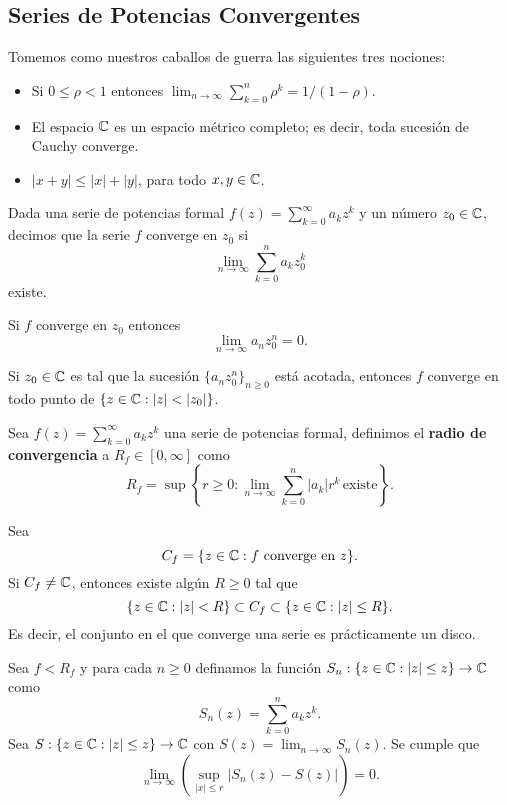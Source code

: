 \subsection{Series de Potencias Convergentes}

Tomemos como nuestros caballos de guerra las siguientes tres nociones:
\begin{itemize}
  \item Si $0 \leq \rho < 1$ entonces $\lim_{n \to \infty} \sum_{k = 0}^n \rho^k = 1 / (1 - \rho)$.
  \item El espacio $\mathbb C$ es un espacio m\'etrico completo; es decir, toda sucesi\'on de Cauchy converge.
  \item $|x + y| \leq |x| + |y|$, para todo $x, y \in \mathbb C$.
\end{itemize}

Dada una serie de potencias formal $f(z) = \sum_{k = 0}^{\infty} a_k z^k$ y un n\'umero $z_0 \in \mathbb C$,
decimos que la serie $f$ converge en $z_0$ si
\[
  \lim_{n \to \infty} \sum_{k = 0}^n a_k z_0^k
\]
existe.

\begin{theorem}
  Si $f$ converge en $z_0$ entonces
  \[
    \lim_{n \to \infty} a_n z_0^n = 0.  
  \]
\end{theorem}

\begin{theorem}
  Si $z_0 \in \mathbb C$ es tal que la sucesi\'on $\{a_n z_0^n\}_{n \geq 0}$ est\'a acotada, entonces
  $f$ converge en todo punto de $\{z \in \mathbb C : |z| < |z_0|\}$.
\end{theorem}

\begin{defn}
  Sea $f(z) = \sum_{k = 0}^{\infty} a_k z^k$ una serie de potencias formal, definimos el
  \textbf{radio de convergencia} a $R_f \in [0, \infty]$ como
  \[
    R_f = \sup\left\{r \geq 0 : \lim_{n \to \infty}\sum_{k = 0}^n |a_k| r^k\, \text{existe}\right\}.
  \]
\end{defn}

\begin{theorem}
  Sea
  \[
    C_f = \{z \in \mathbb C : f \text{ converge en } z\}.
  \]
  Si $C_f \neq \mathbb C$, entonces existe alg\'un $R \geq 0$ tal que
  \[
    \{z \in \mathbb C : |z| < R\} \subset C_f \subset \{z \in \mathbb C : |z| \leq R\}.
  \]
  Es decir, el conjunto en el que converge una serie es pr\'acticamente un disco.
\end{theorem}

\begin{theorem}
  Sea $f < R_f$ y para cada $n \geq 0$ definamos la funci\'on
  $S_n: \{z \in \mathbb C : |z| \leq z\} \to \mathbb C$ como
  \[
    S_n(z) = \sum_{k = 0}^n a_k z^k.  
  \]
  Sea $S: \{z \in \mathbb C : |z| \leq z\} \to \mathbb C$ con $S(z) = \lim_{n \to \infty} S_n(z)$.
  Se cumple que
  \[
    \lim_{n \to \infty} \left(\sup_{|x| \leq r} |S_n(z) - S(z)|\right) = 0.
  \]
\end{theorem}

